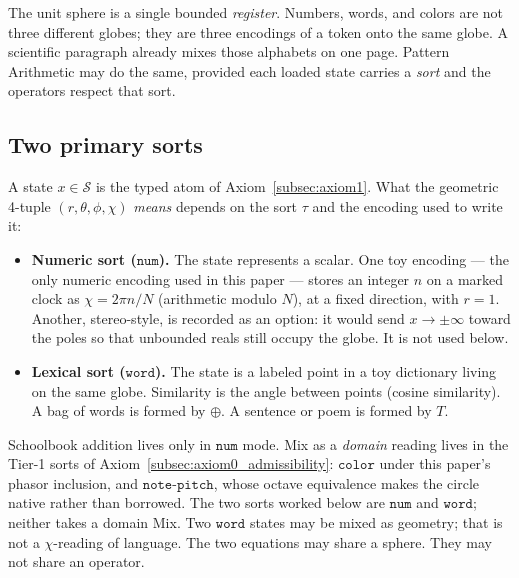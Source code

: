 \documentclass[12pt, a4paper]{article}
\begin{document}
The unit sphere is a single bounded \emph{register}.
Numbers, words, and colors are not three different globes; they are
three encodings of a token onto the same globe. A scientific paragraph
already mixes those alphabets on one page. Pattern Arithmetic may do
the same, provided each loaded state carries a \emph{sort} and the
operators respect that sort.

\subsection{Two primary sorts}
\label{subsec:sorts}
A state $x\in\mathcal{S}$ is the typed atom of
Axiom~\ref{subsec:axiom1}. What the geometric 4-tuple
$(r,\theta,\phi,\chi)$ \emph{means} depends on the sort $\tau$ and the
encoding used to write it:
\begin{itemize}
    \item \textbf{Numeric sort ($\mathtt{num}$).}
          The state represents a scalar. One toy encoding --- the only
          numeric encoding used in this paper --- stores an
          integer $n$ on a marked clock as
          $\chi = 2\pi n/N$ (arithmetic modulo $N$), at a fixed
          direction, with $r=1$.
          Another, stereo-style, is recorded as an option: it would
          send $x\to\pm\infty$ toward the
          poles so that unbounded reals still occupy the globe. It is
          not used below.
    \item \textbf{Lexical sort ($\mathtt{word}$).}
          The state is a labeled point in a toy dictionary living on
          the same globe. Similarity is the angle between points
          (cosine similarity). A bag of words is formed by $\oplus$.
          A sentence or poem is formed by $T$.
\end{itemize}
Schoolbook addition lives only in $\mathtt{num}$ mode.
Mix as a \emph{domain} reading lives in the Tier-1 sorts of
Axiom~\ref{subsec:axiom0_admissibility}: $\mathtt{color}$ under this
paper's phasor inclusion, and $\mathtt{note\text{-}pitch}$, whose
octave equivalence makes the circle native rather than borrowed.
The two sorts worked below are $\mathtt{num}$ and $\mathtt{word}$;
neither takes a domain Mix.
Two $\mathtt{word}$ states may be mixed as geometry; that is not a
$\chi$-reading of language. The two equations may share a sphere.
They may not share an operator.
\end{document}
